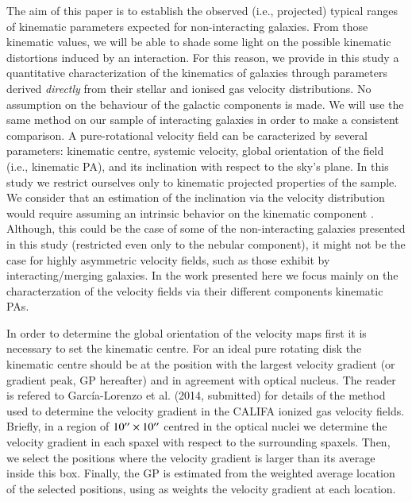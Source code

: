 \documentclass[longauth,traditabstract]{aa}
\begin{document}
The aim of this paper is to establish the observed (i.e., projected) typical ranges of kinematic parameters expected for non-interacting galaxies. From those kinematic values, we will be able to shade some light on the possible kinematic distortions induced by an interaction. For this reason, we provide in this study a quantitative characterization of the kinematics of galaxies through parameters derived \textit{directly} from their stellar and ionised gas velocity
distributions. No assumption on the behaviour of the galactic components is
made. We will use the same method on our sample of interacting galaxies in order 
to make a consistent comparison. A pure-rotational velocity field can be caracterized by several parameters: kinematic centre, systemic velocity, global orientation of the field (i.e., kinematic PA), and its inclination with respect to the sky's plane. In this study we restrict ourselves only to kinematic projected properties of the sample. We consider that an estimation of the inclination via the velocity distribution would require assuming an intrinsic behavior on the kinematic component \citep[e.g., tilted-ring modeling, ][]{2007A&A...468..731J}. Although, this could be the case of some of the non-interacting galaxies presented in this study (restricted even only to the nebular component), it might not be the case for highly asymmetric velocity fields, such as those exhibit by interacting/merging galaxies. In the work presented here we focus mainly on the characterzation of the velocity fields via  their different components kinematic PAs. 

In order to determine the global orientation of the velocity maps first it is necessary to set the kinematic centre. For an ideal pure rotating disk the kinematic centre should be at the position with the largest velocity gradient (or gradient peak, GP hereafter) and in agreement with optical nucleus.  The reader is refered to Garc\'ia-Lorenzo et al. (2014, submitted) for details of the method used to determine the velocity gradient in the CALIFA ionized gas velocity fields.  Briefly, in a region of $10^{\prime\prime}\times10^{\prime\prime}$ centred in the optical nuclei we determine the velocity gradient  in each spaxel with respect to the surrounding spaxels. Then, we select the positions where  the velocity gradient is larger than its average inside this box. Finally, the GP is estimated from the weighted average location of the selected positions, using as weights the velocity gradient at each location.
\end{document}
